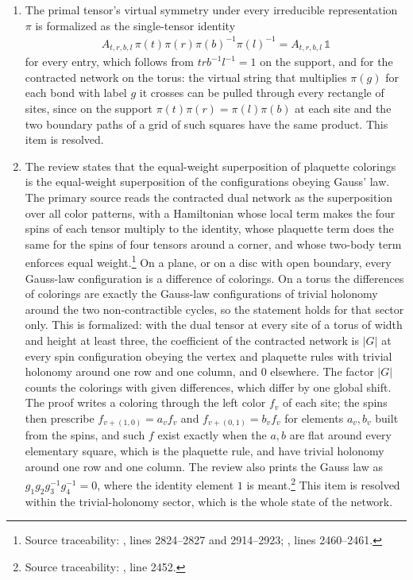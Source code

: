 \documentclass{article}
\begin{document}
\begin{enumerate}
    \item The primal tensor's virtual symmetry under every irreducible
    representation $\pi$ is formalized as the single-tensor identity
    \begin{align}
        A_{t,r,b,l}\,\pi(t)\pi(r)\pi(b)^{-1}\pi(l)^{-1}
          =A_{t,r,b,l}\,\mathbb 1
        \label{eq:rmp_peps_qd_primal_virtual_symmetry}
    \end{align}
    for every entry, which follows from $trb^{-1}l^{-1}=1$ on the support,
    and for the contracted network on the torus: the virtual string that
    multiplies $\pi(g)$ for each bond with label $g$ it crosses can be
    pulled through every rectangle of sites, since on the support
    $\pi(t)\pi(r)=\pi(l)\pi(b)$ at each site and the two boundary paths
    of a grid of such squares have the same product. This item is
    resolved.
    \item The review states that the equal-weight superposition of
    plaquette colorings is the equal-weight superposition of the
    configurations obeying Gauss' law. The primary source reads the
    contracted dual network as the superposition over all color
    patterns, with a Hamiltonian whose local term makes the four spins
    of each tensor multiply to the identity, whose plaquette term does
    the same for the spins of four tensors around a corner, and whose
    two-body term enforces equal weight.\footnote{Source traceability:
        , lines 2824--2827 and
        2914--2923; , lines
        2460--2461.}
    On a plane, or on a disc with open boundary, every Gauss-law
    configuration is a difference of colorings. On a torus the
    differences of colorings are exactly the Gauss-law configurations of
    trivial holonomy around the two non-contractible cycles, so the
    statement holds for that sector only. This is formalized: with the
    dual tensor at every site of a torus of width and height at least
    three, the coefficient of the contracted network is $|G|$ at every
    spin configuration obeying the vertex and plaquette rules with
    trivial holonomy around one row and one column, and $0$ elsewhere.
    The factor $|G|$ counts the colorings with given differences, which
    differ by one global shift. The proof writes a coloring through the
    left color $f_v$ of each site; the spins then prescribe
    $f_{v+(1,0)}=a_vf_v$ and $f_{v+(0,1)}=b_vf_v$ for elements $a_v,b_v$
    built from the spins, and such $f$ exist exactly when the $a,b$ are
    flat around every elementary square, which is the plaquette rule, and
    have trivial holonomy around one row and one column. The review also
    prints the Gauss law as $g_1g_2g_3^{-1}g_4^{-1}=0$, where the
    identity element $1$ is meant.\footnote{Source traceability:
        , line 2452.}
    This item is resolved within the trivial-holonomy sector, which is
    the whole state of the network.
\end{enumerate}
\end{document}
